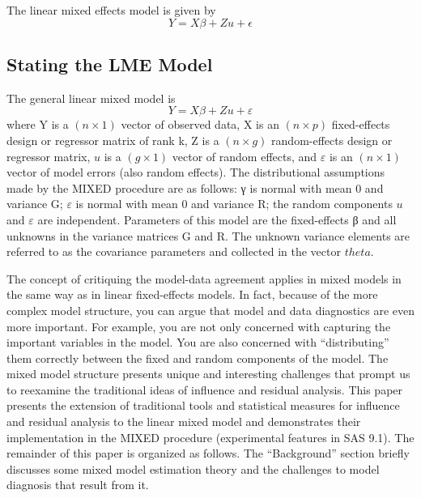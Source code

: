 \documentclass[MAIN.tex]{subfiles}
\begin{document}
The linear mixed effects model is given by
\begin{equation}
Y = X\beta + Zu + \epsilon
\end{equation}




\subsection{Stating the LME Model}
The general linear mixed
model is
\[
Y = X\beta + Zu + \varepsilon\]
where Y is a $(n\times1)$ vector of observed data, X is an $(n\times p)$ fixed-effects design or regressor matrix of rank
k, Z is a $(n \times g)$ random-effects design or regressor matrix, $u$ is a $(g \times 1)$ vector of random effects, and $\varepsilon$ is
an $(n\times1)$ vector of model errors (also random effects). The distributional assumptions made by the MIXED
procedure are as follows: γ is normal with mean 0 and variance G; $\varepsilon$ is normal with mean 0 and variance
R; the random components $u$ and $\varepsilon$ are independent. Parameters of this model are the fixed-effects β and
all unknowns in the variance matrices G and R. The unknown variance elements are referred to as the
covariance parameters and collected in the vector $theta$.

The concept of critiquing the model-data agreement applies in mixed models in the same way as in linear
fixed-effects models. In fact, because of the more complex model structure, you can argue that model and
data diagnostics are even more important. For example, you are not only concerned with capturing the
important variables in the model. You are also concerned with “distributing” them correctly between the
fixed and random components of the model. The mixed model structure presents unique and interesting
challenges that prompt us to reexamine the traditional ideas of influence and residual analysis.
This paper presents the extension of traditional tools and statistical measures for influence and residual
analysis to the linear mixed model and demonstrates their implementation in the MIXED procedure (experimental
features in SAS 9.1). The remainder of this paper is organized as follows. The “Background” section
briefly discusses some mixed model estimation theory and the challenges to model diagnosis that result
from it.

%	
%	
\end{document}
